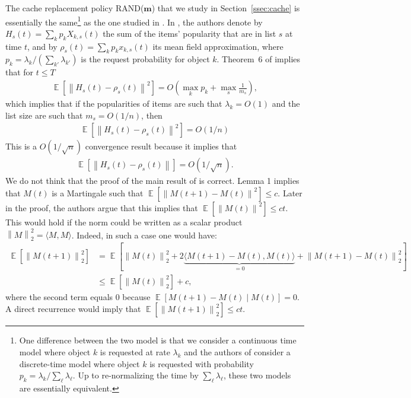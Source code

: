 \documentclass[acmsmall]{acmart}
\newcommand\bm{\mathbf{m}}
\DeclareMathOperator{\E}{\mathbb{E}} %
\newcommand\esp[1]{\E\left[#1\right]} %
\newcommand\norm[1]{\left\|#1\right\|}      %
\newcommand\cro[1]{\langle#1\rangle}         %
\begin{document}
The cache replacement policy RAND($\bm$) that we study in Section~\ref{ssec:cache} is essentially the same\footnote{One difference between the two model is that we consider a continuous time model where object $k$ is requested at rate $\lambda_k$ and the authors of \cite{gastTransientSteadystateRegime2015} consider a discrete-time model where object $k$ is requested with probability $p_k=\lambda_k / \sum_{\ell}\lambda_\ell$. Up to re-normalizing the time by $\sum_{\ell}\lambda_\ell$, these two models are essentially equivalent.} as the one studied in \cite{gastTransientSteadystateRegime2015}. In \cite{gastTransientSteadystateRegime2015}, the authors denote by $H_s(t)=\sum_{k}p_k X_{k,s}(t)$ the sum of the items' popularity that are in list $s$ at time $t$, and by $\rho_s(t)=\sum_{k}p_k x_{k,s}(t)$ its mean field approximation, where $p_k=\lambda_k/(\sum_{k'}\lambda_{k'})$ is the request probability for object $k$. Theorem~6 of \cite{gastTransientSteadystateRegime2015} implies that for $t\le T$
\begin{align*}
  \esp{\norm{ H_s(t) - \rho_s(t)}^2} = O( \max_k p_k + \max_s \frac1{m_s}),
\end{align*}
which implies that if the popularities of items are such that $\lambda_k=O(1)$ and the list size are such that $m_s=O(1/n)$, then
\begin{align*}
  \esp{\norm{ H_s(t) - \rho_s(t)}^2} = O(1/n)
\end{align*}
This is a $O(1/\sqrt{n})$ convergence result because it implies that
\begin{align*}
  \esp{\norm{ H_s(t) - \rho_s(t)}} = O(1/\sqrt{n}).
\end{align*}
We do not think that the proof of the main result of \cite{gastTransientSteadystateRegime2015} is correct. Lemma 1 implies that $M(t)$ is a Martingale such that $\esp{ \norm{M(t+1)-M(t)}^2} \le c$. Later in the proof, the authors argue that this implies that $\esp{\norm{M(t)}^2} \le ct$. This would hold if the norm could be written as a scalar product $\norm{M}_2^2 =\langle M,M\rangle$. Indeed, in such a case one would have:
\begin{align}
  \label{eq:L2_inequality}
  \esp{\norm{M(t+1)}_2^2} &= \esp{\norm{M(t)}_2^2 + 2\underbrace{\cro{M(t+1)-M(t), M(t)}}_{=0}+ \norm{M(t+1)-M(t)}_2^2}\\
  &\le \esp{\norm{M(t)}_2^2} + c,\nonumber
\end{align}
where the second term equals $0$ because $\esp{M(t+1)-M(t)\mid M(t)}=0$. A direct recurrence would imply that $\esp{\norm{M(t+1)}_2^2} \le ct$. 
\end{document}
